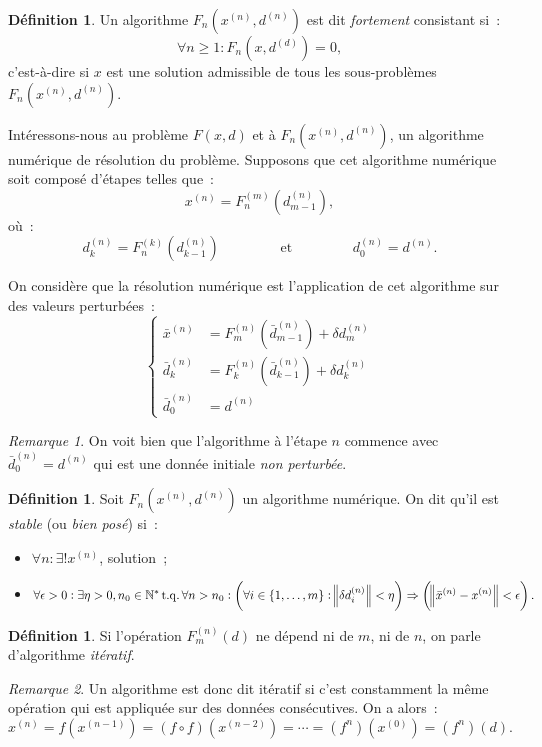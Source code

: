 \documentclass{article}
\theoremstyle{definition}
\newtheorem{déf}[thm]{Définition}
\theoremstyle{remark}
\newtheorem*{rmq}{Remarque}
\DeclareMathOperator{\tq}{t.q.}
\newcommand{\N}{\mathbb N}
\newcommand{\algonum}[3]{F_{#1}(#2^{(#1)}, #3^{(#1)})}
\newcommand{\algnum}{\algonum nxd}
\begin{document}
	\begin{déf} Un algorithme $\algnum$ est dit \emph{fortement} consistant si~:
	\[\forall n \geq 1 : F_n(x, d^{(d)}) = 0,\]
	c'est-à-dire si $x$ est une solution admissible de tous les sous-problèmes $\algnum$.
	\end{déf}

	Intéressons-nous au problème $F(x, d)$ et à $\algnum$, un algorithme numérique de résolution du problème. Supposons que cet algorithme numérique soit composé
	d'étapes telles que~:
	\[x^{(n)} = F_n^{(m)}\left(d_{m-1}^{(n)}\right),\]
	où~:
	\[d_{k}^{(n)} = F_n^{(k)}\left(d_{k-1}^{(n)}\right)\qquad\qquad\text{ et }\qquad\qquad d_0^{(n)} = d^{(n)}.\]

	On considère que la résolution numérique est l'application de cet algorithme sur des valeurs perturbées~:
	\[\begin{cases}
		\bar x^{(n)} &= F_m^{(n)}\left(\bar d_{m-1}^{(n)}\right) + \delta d_m^{(n)} \\
		\bar d_k^{(n)} &= F_{k}^{(n)}\left(\bar d_{k-1}^{(n)}\right) + \delta d_k^{(n)} \\
		\bar d_0^{(n)} &= d^{(n)}
	\end{cases}\]

	\begin{rmq} On voit bien que l'algorithme à l'étape $n$ commence avec $\bar d_0^{(n)} = d^{(n)}$ qui est une donnée initiale \emph{non perturbée}. \end{rmq}

	\begin{déf} Soit $\algnum$ un algorithme numérique. On dit qu'il est \emph{stable} (ou \emph{bien posé}) si~:
	\begin{itemize}
		\item $\forall n : \exists! x^{(n)}$, solution~;
		\item \[\forall \epsilon > 0 : \exists \eta > 0, n_0 \in \N^* \tq \forall n > n_0 :
			\left(\forall i \in \{1, \dotsc, m\} : \norm {\delta d_i^{(n)}} < \eta\right) \Rightarrow \left(\norm {\bar x^{(n)}-x^{(n)}} < \epsilon\right).\]
	\end{itemize}
	\end{déf}

	\begin{déf} Si l'opération $F_m^{(n)}(d)$ ne dépend ni de $m$, ni de $n$, on parle d'algorithme \emph{itératif}. \end{déf}

	\begin{rmq} Un algorithme est donc dit itératif si c'est constamment la même opération qui est appliquée sur des données consécutives. On a alors~:
	\[x^{(n)} = f(x^{(n-1)}) = (f \circ f)(x^{(n-2)}) = \dotsb = \left(f^n\right)(x^{(0)}) = \left(f^n\right)(d).\]
	\end{rmq}
\end{document}
